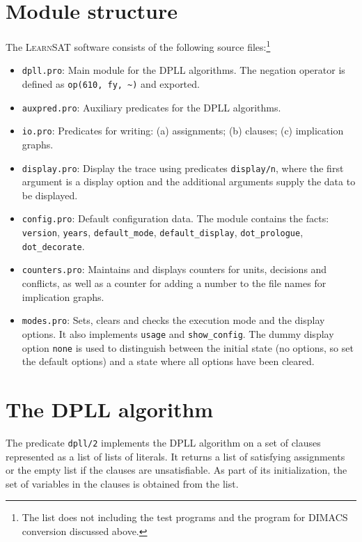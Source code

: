 \documentclass[11pt]{report}
\newcommand*{\p}[1]{\textup{\texttt{#1}}}
\newcommand*{\ls}{\textsc{LearnSAT}}
\begin{document}
\section{Module structure}

The \ls{} software consists of the following source files:\footnote{The
list does not including the test programs and the program for DIMACS
conversion discussed above.}

\begin{itemize}
\item \p{dpll.pro}: Main module for the DPLL algorithms.
The negation operator is defined as \verb+op(610, fy, ~)+ and exported.

\item \p{auxpred.pro}: Auxiliary predicates for the DPLL algorithms. 

\item \p{io.pro}: Predicates for writing: (a) assignments; (b) clauses;
(c) implication graphs.

\item \p{display.pro}: Display the trace using predicates \p{display/n},
where the first argument is a display option and the additional
arguments supply the data to be displayed.

\item \p{config.pro}: Default configuration data. The module contains
the facts: \p{version}, \p{years}, \p{default\_mode},
\p{default\_display}, \p{dot\_prologue}, \p{dot\_decorate}.

\item \p{counters.pro}: Maintains and displays counters for units,
decisions and conflicts, as well as a counter for adding a number to the
file names for implication graphs.

\item \p{modes.pro}: Sets, clears and checks the execution mode and the
display options. It also implements \p{usage} and \p{show\_config}. The
dummy display option \p{none} is used to distinguish between the initial
state (no options, so set the default options) and a state where all
options have been cleared.

\end{itemize}

\newpage

\section{The DPLL algorithm}

The predicate \p{dpll/2} implements the DPLL algorithm on a set of
clauses represented as a list of lists of literals. It returns a list of
satisfying assignments or the empty list if the clauses are
unsatisfiable. As part of its initialization, the set of variables in
the clauses is obtained from the list.
\end{document}
